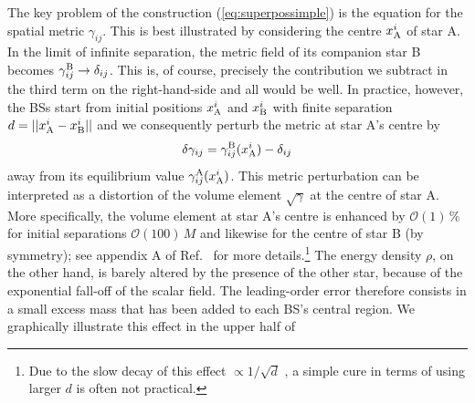 \documentclass[]{iopart}
\begin{document}
The key problem of the construction (\ref{eq:superpossimple})
is the equation for the spatial metric $\gamma_{ij}$. This is best
illustrated by considering the centre $x_{\rm A}^i$ of star A.
In the limit of infinite separation, the metric field of its
companion star B becomes $\gamma_{ij}^{\rm B}\rightarrow \delta_{ij}$.
This is, of course, precisely the contribution we subtract in
the third term on the right-hand-side and all would be well.
In practice, however, the BSs start from initial positions
$x_{\rm A}^i$ and $x_{\rm B}^i$ with finite separation
$d=||x_{\rm A}^i-x_{\rm B}^i||$ and we consequently perturb
the metric at star A's centre by
%
\begin{equation}
  \delta \gamma_{ij} = \gamma_{ij}^{\rm B}(x^i_{\rm A})
  -\delta_{ij}
  \label{eq:metricpert}
\end{equation}
%
away from its equilibrium value $\gamma_{ij}^{\rm A}(x_{\rm A}^i)$.
This metric perturbation can be interpreted as a distortion of
the volume element $\sqrt{\gamma}$
at the centre of star A. More specifically, the volume element
at star A's centre is enhanced by $\mathcal{O}(1)\,\%$ for initial
separations $\mathcal{O}(100)\,M$ and likewise for the centre of
star B (by symmetry); see appendix A of Ref.~\cite{Helfer:2018vtq}
for more details.\footnote{Due to the slow decay of this effect $\propto 1/\sqrt{d}$ \cite{Helfer:2018vtq},
a simple cure in terms of using larger $d$ is often not practical.}
The energy density $\rho$, on the other hand, is barely altered by the
presence of the other star, because of the exponential fall-off of
the scalar field. The leading-order error therefore consists in a
small excess mass that has been added to each BS's central region.
We graphically illustrate this effect in the upper half of
%
\end{document}
